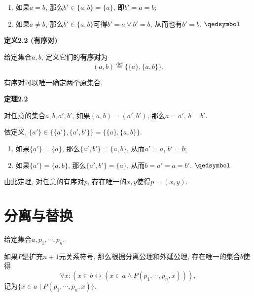 \documentclass[UTF8]{ctexart}
\begin{document}
\begin{enumerate}
    \item 如果$a=b$, 那么$b'\in\{a,b\}=\{a\}$, 即$b'=a=b$;
    \item 如果$a\neq b$, 那么$b'\in\{a,b\}$可得$b'=a\lor b'=b$, 从而也有$b'=b$.
    \hfill $\qedsymbol$
\end{enumerate}

\vspace{10pt}

\hypertarget{sec:定义2.2}{}
\noindent\textbf{定义2.2 (有序对)}

给定集合$a,b$, 定义它们的\textbf{有序对}为
\[
    (a,b)\overset{\mathrm{def}}{=}\{\{a\},\{a,b\}\}.
\]

\vspace{10pt}

有序对可以唯一确定两个原集合.

\vspace{10pt}

\hypertarget{sec:定理2.2}{}
\noindent\textbf{定理2.2}

对任意的集合$a,b,a',b'$, 如果$(a,b)=(a',b')$, 那么$a=a'$, $b=b'$.


依定义, $\{a'\}\in\{\{a'\},\{a',b'\}\}=\{\{a\},\{a,b\}\}$.

\begin{enumerate}
    \item 如果$\{a'\}=\{a\}$, 那么$\{a',b'\}=\{a,b\}$, 从而$a'=a$, $b'=b$;
    \item 如果$\{a'\}=\{a,b\}$, 那么$\{a',b'\}=\{a\}$, 从而$b=a'=a=b'$.
    \hfill $\qedsymbol$
\end{enumerate}

\vspace{10pt}

由此定理, 对任意的有序对$p$, 存在唯一的$x,y$使得$p=(x,y)$.





\newpage

\section{分离与替换}

给定集合$a,p_1,\cdots,p_n$.

如果$P$是扩充$n+1$元关系符号, 那么根据分离公理和外延公理, 存在唯一的集合$b$使得
\[
    \forall x:(x\in b\leftrightarrow(x\in a\land P(p_1,\cdots,p_n,x))),
\]
记为$\{x\in a\mid P(p_1,\cdots,p_n,x)\}$.
\end{document}
